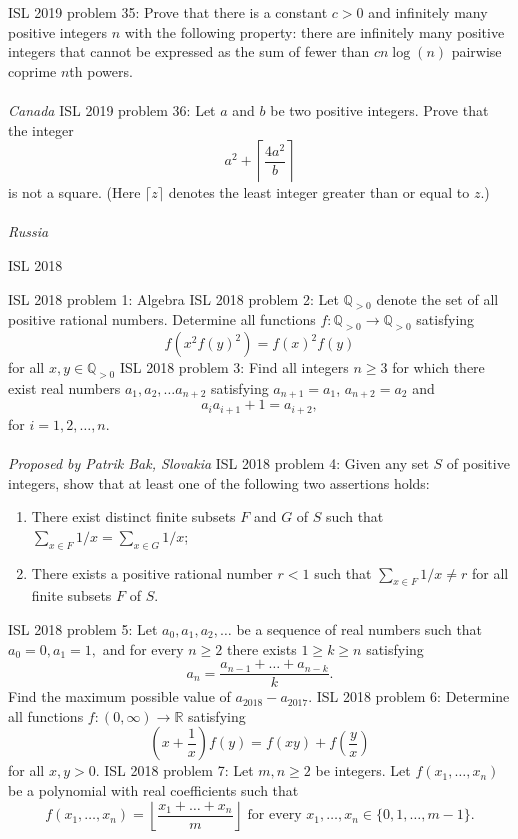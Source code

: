 ISL 2019 problem 35:  Prove that there is a constant $c>0$ and infinitely many positive integers $n$ with the following property: there are infinitely many positive integers that cannot be expressed as the sum of fewer than $cn\log(n)$ pairwise coprime $n$th  powers. \\\\
\textit{Canada} 
ISL 2019 problem 36:  Let $a$ and $b$ be two positive integers. Prove that the integer
\[ a^2+\left\lceil\frac{4a^2}b\right\rceil \]
is not a square. (Here $\lceil z\rceil$ denotes the least integer greater than or equal to $z$.) \\\\
\textit{Russia} 

ISL 2018 

ISL 2018 problem 1:  Algebra 
ISL 2018 problem 2:  Let $\mathbb{Q}_{>0}$ denote the set of all positive rational numbers. Determine all functions $f:\mathbb{Q}_{>0}\to \mathbb{Q}_{>0}$ satisfying
\[ f(x^2f(y)^2)=f(x)^2f(y) \]
for all $x,y\in\mathbb{Q}_{>0}$ 
ISL 2018 problem 3:  Find all integers $n \geq 3$ for which there exist real numbers $a_1, a_2, \dots a_{n + 2}$ satisfying $a_{n + 1} = a_1$, $a_{n + 2} = a_2$ and
\[ a_ia_{i + 1} + 1 = a_{i + 2}, \]
for $i = 1, 2, \dots, n$. \\\\
\textit{Proposed by Patrik Bak, Slovakia} 
ISL 2018 problem 4:  Given any set $S$ of positive integers, show that at least one of the following two assertions holds:
\begin{enumerate}[(1)]
  \item There exist distinct finite subsets $F$ and $G$ of $S$ such that $\sum_{x\in F}1/x=\sum_{x\in G}1/x$;
  \item There exists a positive rational number $r<1$ such that $\sum_{x\in F}1/x\neq r$ for all finite subsets $F$ of $S$.
\end{enumerate} 
ISL 2018 problem 5:  Let $a_0,a_1,a_2,\dots $ be a sequence of real numbers such that $a_0=0, a_1=1,$ and for every $n\geq 2$ there exists $1\geq k \geq n$ satisfying
\[ a_n=\frac{a_{n-1}+\dots + a_{n-k}}{k}. \]
Find the maximum possible value of $a_{2018}-a_{2017}$. 
ISL 2018 problem 6:  Determine all functions $f:(0,\infty)\to\mathbb{R}$ satisfying
\[ \left(x+\frac{1}{x}\right)f(y)=f(xy)+f\left(\frac{y}{x}\right) \]
for all $x,y>0$. 
ISL 2018 problem 7:  Let $m,n\geq 2$ be integers. Let $f(x_1,\dots, x_n)$ be a polynomial with real coefficients such that
\[
f(x_1,\dots, x_n)=\left\lfloor \frac{x_1+\dots + x_n}{m} \right\rfloor\text{ for every } x_1,\dots, x_n\in \{0,1,\dots, m-1\}.
\]
